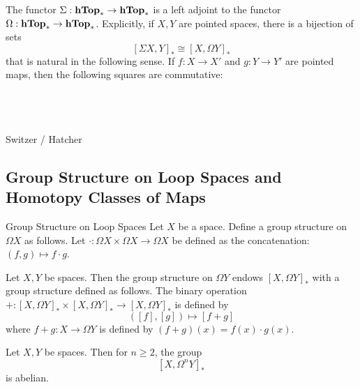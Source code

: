 \documentclass[a4paper]{article}
\begin{document}
\begin{thm}{}{} The functor $\Sigma:\bold{hTop}_\ast\to\bold{hTop}_\ast$ is a left adjoint to the functor $\Omega:\bold{hTop}_\ast\to\bold{hTop}_\ast$. Explicitly, if $X,Y$ are pointed spaces, there is a bijection of sets $$[\Sigma X,Y]_\ast\cong[X,\Omega Y]_\ast$$ that is natural in the following sense. If $f:X\to X'$ and $g:Y\to Y'$ are pointed maps, then the following squares are commutative: \\~\\
\\~\\
\end{thm}

Switzer / Hatcher

\subsection{Group Structure on Loop Spaces and Homotopy Classes of Maps}
\begin{defn}{Group Structure on Loop Spaces}{} Let $X$ be a space. Define a group structure on $\Omega X$ as follows. Let $\cdot:\Omega X\times\Omega X\to\Omega X$ be defined as the concatenation: $(f,g)\mapsto f\cdot g$. 
\end{defn}

\begin{prp}{}{} Let $X,Y$ be spaces. Then the group structure on $\Omega Y$ endows $[X,\Omega Y]_\ast$ with a group structure defined as follows. The binary operation $+:[X,\Omega Y]_\ast\times[X,\Omega Y]_\ast\to[X,\Omega Y]_\ast$ is defined by $$([f],[g])\mapsto[f+g]$$ where $f+g:X\to\Omega Y$ is defined by $(f+g)(x)=f(x)\cdot g(x)$. 
\end{prp}

\begin{prp}{}{} Let $X,Y$ be spaces. Then for $n\geq 2$, the group $$[X,\Omega^n Y]_\ast$$ is abelian. 
\end{prp}
\end{document}

